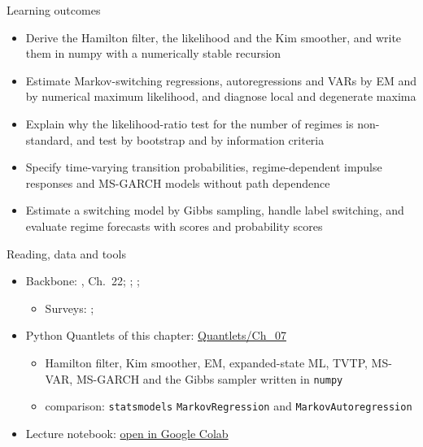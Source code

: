 \begin{frame}{Learning outcomes}
\itemsize{\small}
\begin{itemize}
    \item Derive the Hamilton filter, the likelihood and the Kim smoother, and write them in numpy with a numerically stable recursion
    \item Estimate Markov-switching regressions, autoregressions and VARs by EM and by numerical maximum likelihood, and diagnose local and degenerate maxima
    \item Explain why the likelihood-ratio test for the number of regimes is non-standard, and test by bootstrap and by information criteria
    \item Specify time-varying transition probabilities, regime-dependent impulse responses and MS-GARCH models without path dependence
    \item Estimate a switching model by Gibbs sampling, handle label switching, and evaluate regime forecasts with scores and probability scores
\end{itemize}
\end{frame}

\begin{frame}{Reading, data and tools}
\itemsize{\small}
\begin{itemize}
    \item Backbone: , Ch.~22; ; ; 
    \begin{itemize}
        \item Surveys: ; 
    \end{itemize}
    \item Python Quantlets of this chapter: \href{https://github.com/danpele/Advanced-Time-Series/tree/main/Quantlets/Ch_07}{Quantlets/Ch\_07}
    \begin{itemize}
        \item Hamilton filter, Kim smoother, EM, expanded-state ML, TVTP, MS-VAR, MS-GARCH and the Gibbs sampler written in \texttt{numpy}
        \item comparison: \texttt{statsmodels} \texttt{MarkovRegression} and \texttt{MarkovAutoregression}
    \end{itemize}
    \item Lecture notebook: \href{\colaburl{notebooks/EN/chapter7_lecture_notebook.ipynb}}{open in Google Colab}
\end{itemize}
\end{frame}

